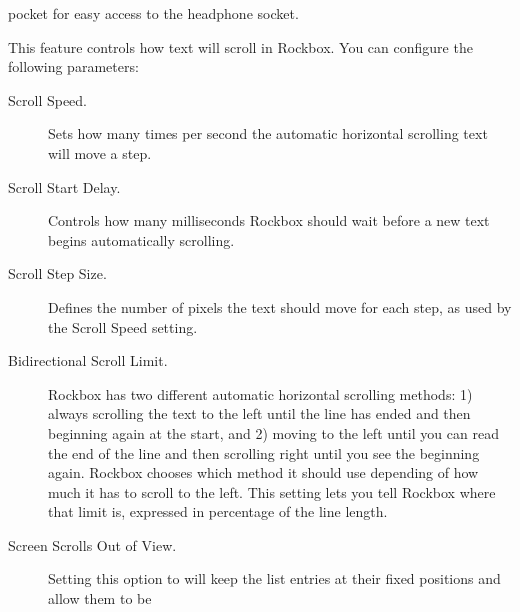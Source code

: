 \begin{description}
{\begin{description}
         pocket for easy access to the headphone socket.
    \end{description}
  }
%
  \item[Scrolling.]
    This feature controls how text will scroll in Rockbox. You can configure
    the following parameters:
    \begin{description}
    \item[Scroll Speed.]
      Sets how many times per second the automatic horizontal scrolling text
      will move a step.
    \item[Scroll Start Delay.]
      Controls how many milliseconds Rockbox should wait before a new
      text begins automatically scrolling.
      \item[Scroll Step Size.]
        Defines the number of pixels the text should move for each step, as used
        by the Scroll Speed setting.
    \item[Bidirectional Scroll Limit.]
      Rockbox has two different automatic horizontal scrolling methods: 1) always
      scrolling the text to the left until the line has ended and then beginning
      again at the start, and 2) moving to the left until you can read the end of
      the line and then scrolling right until you see the beginning again.
      Rockbox chooses which method it should use depending of how much it has to
      scroll to the left. This setting lets you tell Rockbox where that limit
      is, expressed in percentage of the line length.
    \item[Screen Scrolls Out of View.]
      Setting this option to 
      will keep the list entries at their fixed positions and allow them to be

\end{description}
\end{description}
